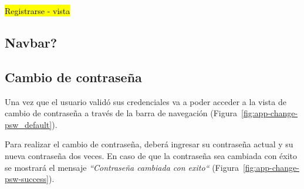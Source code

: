 \begin{itemize}
\hl{Registrarse - vista}
\subsection{Navbar?}

\subsection{Cambio de contraseña}
Una vez que el usuario validó sus credenciales va a poder acceder a la vista de cambio de contraseña a través de la barra de navegación (Figura~\ref{fig:app-change-psw_default}).



Para realizar el cambio de contraseña, deberá ingresar su contraseña actual y su nueva contraseña dos veces.
En caso de que la contraseña sea cambiada con éxito se mostrará el mensaje \textit{“Contraseña cambiada con exito“} (Figura~\ref{fig:app-change-psw-success}).



\end{itemize}
